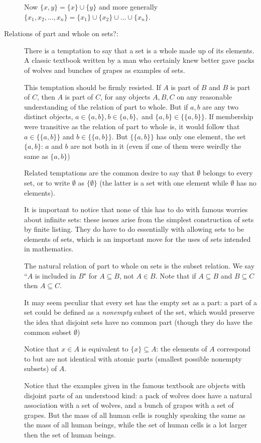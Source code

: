 \documentclass[12pt]{article}
\begin{document}
\begin{description}
Now $\{x,y\} = \{x\} \cup \{y\}$ and more generally $\{x_1,x_2,\ldots,x_n\} = \{x_1\} \cup \{x_2\} \cup \ldots \cup \{x_n\}$.

\item[Relations of part and whole on sets?:]  There is a temptation to say that a set is a whole made up of its elements.
A classic textbook written by a man who certainly knew better gave packs of wolves and bunches of grapes as examples of sets.

This temptation should be firmly resisted.  If $A$ is part of $B$ and $B$ is part of $C$, then $A$ is part of $C$, for any objects $A,B,C$ on any reasonable understanding of the relation of part to whole.  But if $a,b$ are any two distinct objects, $a \in \{a,b\}, b \in \{a,b\},$ and $\{a,b\} \in \{\{a,b\}\}$.  If membership were transitive as the relation of part to whole is, it would follow that $a \in \{\{a,b\}\}$ and $b \in \{\{a,b\}\}$.  But $\{\{a,b\}\}$ has only one element, the set $\{a,b\}$:  $a$ and $b$ are not both in it (even if one of them were weirdly the same as $\{a,b\}$)

Related temptations are the common desire to say that $\emptyset$ belongs to every set, or to write $\emptyset$
as $\{\emptyset\}$ (the latter is a set with one element while $\emptyset$ has no elements).

It is important to notice that none of this has to do with famous worries about infinite sets:  these issues arise from the simplest construction of sets by finite listing.  They do have to do essentially with allowing sets to be elements of sets, which is an important move for the uses of sets intended in mathematics.

The natural relation of part to whole on sets is the subset relation.  We say ``$A$ is included in $B$" for $A \subseteq B$, not $A \in B$.  Note that if $A \subseteq B$ and $B \subseteq C$ then $A \subseteq C$.

It may seem peculiar that every set has the empty set as a part:  a part of a set could be defined as a {\em nonempty\/} subset of the set, which would preserve the idea that disjoint sets have no common part (though they do have the common subset $\emptyset$)

Notice that $x \in A$ is equivalent to $\{x\} \subseteq A$:  the elements of $A$ correspond to but are not identical with atomic parts (smallest possible nonempty subsets) of $A$.

Notice that the examples given in the famous textbook are objects with disjoint parts of an understood kind:  a pack of wolves does have a natural association with a set of wolves, and a bunch of grapes with a set of grapes.   But the mass of all human cells is roughly speaking the same as the mass of all human beings, while the set of human cells is a lot larger then the set of human beings.





\end{description}
\end{document}
